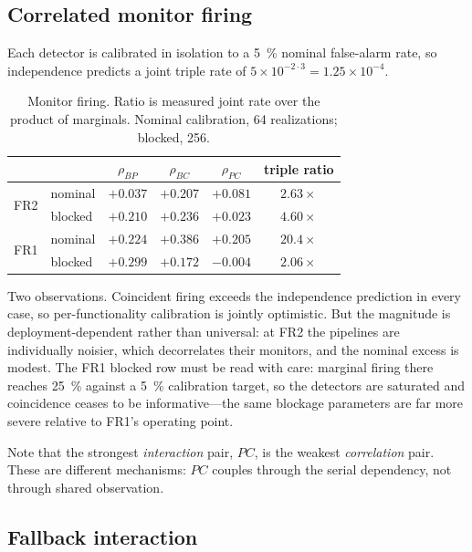 \subsection{Correlated monitor firing}
\label{sec:correlation}

Each detector is calibrated in isolation to a \SI{5}{\percent} nominal
false-alarm rate, so independence predicts a joint triple rate of
$5\times10^{-2\cdot3}=1.25\times10^{-4}$.

\begin{table}[t]
\caption{Monitor firing. Ratio is measured joint rate over the product of
marginals. Nominal calibration, 64 realizations; blocked, 256.}
\label{tab:correlation}
\centering
\begin{tabular}{llcccc}
\toprule
 & & $\rho_{BP}$ & $\rho_{BC}$ & $\rho_{PC}$ & triple ratio \\
\midrule
\multirow{2}{*}{FR2} & nominal & $+0.037$ & $+0.207$ & $+0.081$ & $2.63\times$ \\
                     & blocked & $+0.210$ & $+0.236$ & $+0.023$ & $4.60\times$ \\
\multirow{2}{*}{FR1} & nominal & $+0.224$ & $+0.386$ & $+0.205$ & $20.4\times$ \\
                     & blocked & $+0.299$ & $+0.172$ & $-0.004$ & $2.06\times$ \\
\bottomrule
\end{tabular}
\end{table}

Two observations. Coincident firing exceeds the independence prediction in
every case, so per-functionality calibration is jointly optimistic. But the
magnitude is deployment-dependent rather than universal: at FR2 the
pipelines are individually noisier, which decorrelates their monitors, and
the nominal excess is modest. The FR1 blocked row must be read with care:
marginal firing there reaches \SI{25}{\percent} against a
\SI{5}{\percent} calibration target, so the detectors are saturated and
coincidence ceases to be informative---the same blockage parameters are far
more severe relative to FR1's operating point.

Note that the strongest \emph{interaction} pair, $PC$, is the weakest
\emph{correlation} pair. These are different mechanisms: $PC$ couples
through the serial dependency, not through shared observation.

\subsection{Fallback interaction}
\label{sec:interaction}

